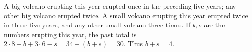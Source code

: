 A big volcano erupting this year erupted once in the preceding five years; any other big volcano erupted twice. A small volcano erupting this year erupted twice in those five years, and any other small volcano three times. If $b,s$ are the numbers erupting this year, the past total is $2\cdot8-b+3\cdot6-s=34-(b+s)=30$. Thus $\boxed{b+s=4}$.
